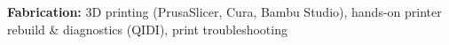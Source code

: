 \textbf{Fabrication:} 3D printing (PrusaSlicer, Cura, Bambu Studio), hands-on printer rebuild \& diagnostics (QIDI), print troubleshooting \\
